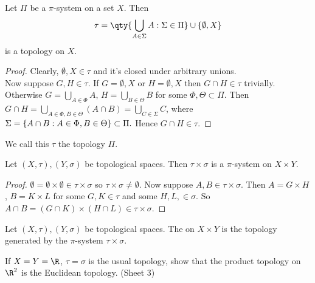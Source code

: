 \begin{proposition} \label{prp:37}
Let $\Pi$ be a $\pi$-system on a set $X$. Then 
\begin{align*}
    \tau = \qty{\bigcup_{A\in \Sigma} A : \Sigma\in \Pi} \cup \set{\emptyset, X}
\end{align*} is a topology on $X$.
\end{proposition}  

\begin{proof}
Clearly, $\emptyset, X\in \tau$ and it's closed under arbitrary unions. \\
Now suppose $G,H \in \tau$.
If $G = \emptyset, X$ or $H = \emptyset, X$ then $G \cap H \in \tau$ trivially. \\
Otherwise $G = \bigcup_{A\in \Phi} A$, $H =\bigcup_{B \in \Theta} B$ for some $\Phi, \Theta \subset \Pi$.
Then $G \cap H = \bigcup_{A\in \Phi, B\in \Theta} (A \cap B) = \bigcup_{C \in \Sigma} C$, where $\Sigma = \{A \cap B : A\in \Phi, B\in \Theta\}\subset \Pi.$ Hence $G\cap H\in \tau$.
\end{proof}

\begin{definition}
We call this $\tau$ the topology  $\Pi$.
\end{definition}

\begin{proposition} \label{prp:38}
Let $(X,\tau), (Y,\sigma)$ be topological spaces. Then $\tau\times \sigma$ is a $\pi$-system on $X\times Y$.
\end{proposition}

\begin{proof}
$\emptyset = \emptyset \times \emptyset \in \tau\times \sigma$ so $\tau\times \sigma\neq \emptyset$. Now suppose $A,B\in\tau\times \sigma $. Then $A = G\times H$, $B=K\times L$ for some $G,K\in \tau$ and some $H,L,\in \sigma$. So $A\cap B = (G\cap K)\times (H\cap L) \in \tau\times \sigma$.
\end{proof}

\begin{definition}
Let $(X,\tau), (Y,\sigma)$ be topological spaces. The  on $X\times Y$ is the topology generated by the $\pi$-system $\tau \times \sigma$.
\end{definition}
\begin{exercise*}
If $X=Y=\R$, $\tau=\sigma$ is the usual topology, show that the product topology on $\R^2$ is the Euclidean topology. (Sheet 3)
\end{exercise*}

